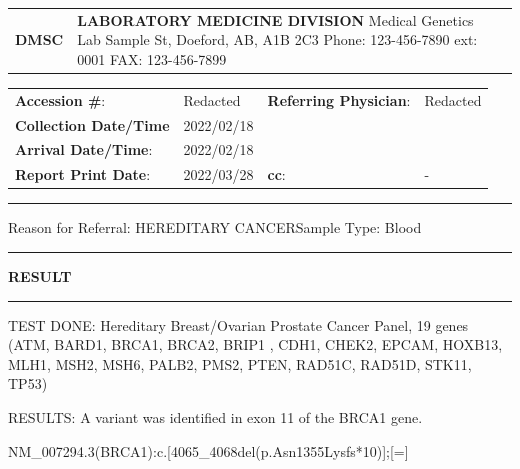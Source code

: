 \documentclass[10pt]{article}
\begin{document}
\begin{tabular}{p{3cm} >{\centering\arraybackslash}p{12.5cm} p{3cm}}
{\Huge \bf DMSC} & {\Large \bf LABORATORY MEDICINE DIVISION} \newline
Medical Genetics Lab \newline
123 Sample St, Doeford, AB, A1B 2C3 \newline
Phone: 123-456-7890 ext: 0001 FAX: 123-456-7899 \newline \\
\end{tabular}


\begin{tabular}{p{4cm} p{5cm} p{4cm} p{5cm}}
{\bf Accession \#}: & Redacted & {\bf Referring Physician}: & Redacted\\
{\bf Collection Date/Time} & 2022/02/18 & & \\
{\bf Arrival Date/Time}: & 2022/02/18 & & \\
{\bf Report Print Date}: & 2022/03/28 & {\bf cc}: & - \\
\end{tabular}

\rule{\textwidth}{0.5mm}

Reason for Referral: HEREDITARY CANCER\hfill Sample Type: Blood

\rule{\textwidth}{0.5mm}
\vspace{-2.8em}
\begin{center}{\large \bf RESULT}\end{center}
\vspace{-2.3em}
\rule{\textwidth}{0.5mm}

TEST DONE: Hereditary Breast/Ovarian Prostate Cancer Panel, 19 genes (ATM, BARD1, BRCA1, BRCA2, BRIP1 , CDH1, CHEK2, EPCAM, HOXB13, MLH1, MSH2, MSH6, PALB2, PMS2, PTEN, RAD51C, RAD51D, STK11, TP53)

RESULTS: A variant was identified in exon 11 of the BRCA1 gene.

NM\_007294.3(BRCA1):c.[4065\_4068del(p.Asn1355Lysfs*10)];[=]
\end{document}
